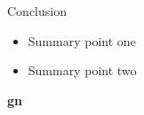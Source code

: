 \begin{frame}{Conclusion}
  \begin{itemize}
    \item Summary point one
    \item Summary point two
  \end{itemize}
\end{frame}

\begin{frame}[plain]
  \begin{center}
    \vfill
    {\Huge\bfseries\color{stplwhite} gn}
    \vfill
  \end{center}
\end{frame}


